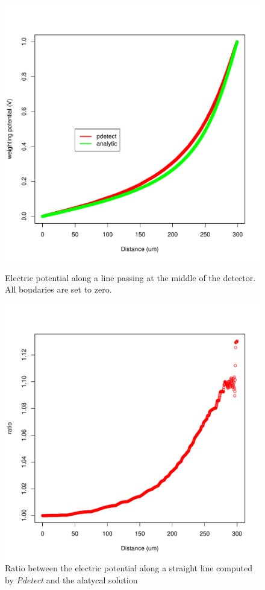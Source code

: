\documentclass[11pt]{article}
\begin{document}
			\begin{figure}[H]
				\begin{minipage}[b]{.46\linewidth}
					\center
					\includegraphics[scale=0.5]{images/annexe/zero.pdf}
					\caption{Electric potential along a line passing at the middle of the detector.
							All boudaries are set to zero.}
					\label{fig:zero_conditions}
				\end{minipage} \hfill
				\begin{minipage}[b]{.46\linewidth}
					\center
					\includegraphics[scale=0.5]{images/annexe/zero_ratio.pdf}
					\caption{Ratio between the electric potential along a straight line 
							computed by \textit{Pdetect} and the alatycal solution}
					\label{fig:zero_ratio}
					\end{minipage}
			\end{figure}
\end{document}
